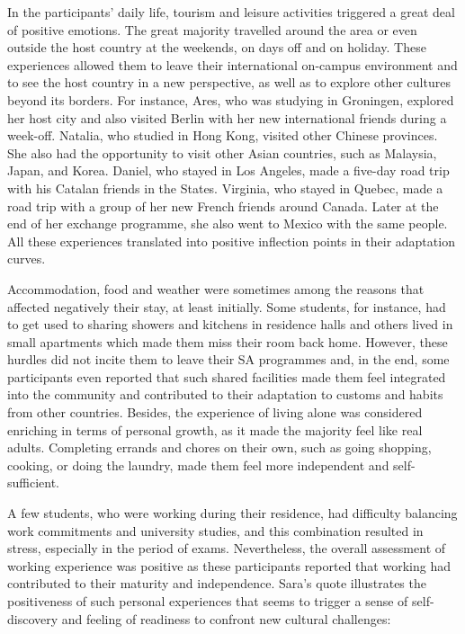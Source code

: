 \documentclass[12pt]{article}
\newenvironment{styleStandard}{\setlength\leftskip{0cm}\setlength\rightskip{0cm plus 1fil}\setlength\parindent{0cm}\setlength\parfillskip{0pt plus 1fil}\setlength\parskip{0in plus 1pt}\writerlistparindent\writerlistleftskip\leavevmode\normalfont\normalsize\writerlistlabel\ignorespaces}{\unskip\vspace{0.111in plus 0.0111in}\par}
\newcommand\writerlistleftskip{}
\newcommand\writerlistparindent{}
\newcommand\writerlistlabel{}
\begin{document}
\begin{styleStandard}
In the participants’ daily life, tourism and leisure activities triggered a great deal of positive emotions. The great majority travelled around the area or even outside the host country at the weekends, on days off and on holiday. These experiences allowed them to leave their international on-campus environment and to see the host country in a new perspective, as well as to explore other cultures beyond its borders. For instance, Ares, who was studying in Groningen, explored her host city and also visited Berlin with her new international friends during a week-off. Natalia, who studied in Hong Kong, visited other Chinese provinces. She also had the opportunity to visit other Asian countries, such as Malaysia, Japan, and Korea. Daniel, who stayed in Los Angeles, made a five-day road trip with his Catalan friends in the States. Virginia, who stayed in Quebec, made a road trip with a group of her new French friends around Canada. Later at the end of her exchange programme, she also went to Mexico with the same people. All these experiences translated into positive inflection points in their adaptation curves. 
\end{styleStandard}

\begin{styleStandard}
Accommodation, food and weather were sometimes among the reasons that affected negatively their stay, at least initially. Some students, for instance, had to get used to sharing showers and kitchens in residence halls and others lived in small apartments which made them miss their room back home. However, these hurdles did not incite them to leave their SA programmes and, in the end, some participants even reported that such shared facilities made them feel integrated into the community and contributed to their adaptation to customs and habits from other countries. Besides, the experience of living alone was considered enriching in terms of personal growth, as it made the majority feel like real adults. Completing errands and chores on their own, such as going shopping, cooking, or doing the laundry, made them feel more independent and self-sufficient. 
\end{styleStandard}

\begin{styleStandard}
A few students, who were working during their residence, had difficulty balancing work commitments and university studies, and this combination resulted in stress, especially in the period of exams. Nevertheless, the overall assessment of working experience was positive as these participants reported that working had contributed to their maturity and independence. Sara’s quote illustrates the positiveness of such personal experiences that seems to trigger a sense of self-discovery and feeling of readiness to confront new cultural challenges:
\end{styleStandard}
\end{document}
